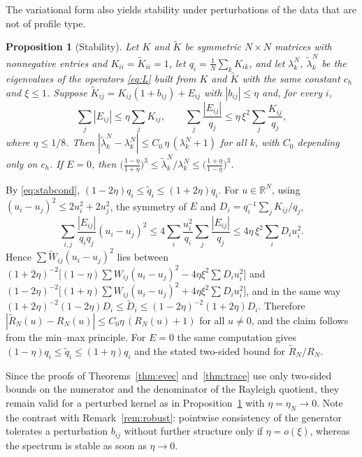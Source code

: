 \documentclass[11pt,a4paper]{article}
\makeatletter
\theoremstyle{stmt}
\newtheorem{proposition}[theorem]{Proposition}
\theoremstyle{defn}
\theoremstyle{rmk}
\renewenvironment{proof}[1][\proofname]{\par\pushQED{\qed}\normalfont\topsep6\p@\@plus6\p@\relax
  \trivlist\item[\hskip\labelsep{\sffamily\itshape\small #1.}]\ignorespaces}{\popQED\endtrivlist\@endpefalse}
\numberwithin{equation}{section}
\newcommand{\R}{\mathbb{R}}
\makeatother
\begin{document}
The variational form also yields stability under perturbations of the data that are not of profile type.

\begin{proposition}[Stability]\label{prop:stab}
Let $K$ and $\tilde K$ be symmetric $N\times N$ matrices with nonnegative entries and $K_{ii}=\tilde K_{ii}=1$, let $q_i=\frac1N\sum_kK_{ik}$, and let $\lambda^N_k$, $\tilde\lambda^N_k$ be the eigenvalues of the operators \eqref{eq:L} built from $K$ and $\tilde K$ with the same constant $c_h$ and $\xi\le1$. Suppose $\tilde K_{ij}=K_{ij}(1+b_{ij})+E_{ij}$ with $|b_{ij}|\le\eta$ and, for every $i$,
\begin{equation}\label{eq:stabcond}
\sum_j|E_{ij}|\le\eta\sum_jK_{ij},\qquad \sum_j\frac{|E_{ij}|}{q_j}\le\eta\,\xi^2\sum_j\frac{K_{ij}}{q_j},
\end{equation}
where $\eta\le1/8$. Then $|\tilde\lambda^N_k-\lambda^N_k|\le C_0\,\eta\,(\lambda^N_k+1)$ for all $k$, with $C_0$ depending only on $c_h$. If $E=0$, then $\big(\tfrac{1-\eta}{1+\eta}\big)^3\le\tilde\lambda_k^N/\lambda_k^N\le\big(\tfrac{1+\eta}{1-\eta}\big)^3$.
\end{proposition}

\begin{proof}
By \eqref{eq:stabcond}, $(1-2\eta)q_i\le\tilde q_i\le(1+2\eta)q_i$. For $u\in\R^N$, using $(u_i-u_j)^2\le2u_i^2+2u_j^2$, the symmetry of $E$ and $D_i=q_i^{-1}\sum_jK_{ij}/q_j$,
\[
\sum_{i,j}\frac{|E_{ij}|}{q_iq_j}(u_i-u_j)^2\le4\sum_i\frac{u_i^2}{q_i}\sum_j\frac{|E_{ij}|}{q_j}\le4\eta\,\xi^2\sum_iD_iu_i^2 .
\]
Hence $\sum\tilde W_{ij}(u_i-u_j)^2$ lies between $(1+2\eta)^{-2}\big[(1-\eta)\sum W_{ij}(u_i-u_j)^2-4\eta\xi^2\sum D_iu_i^2\big]$ and $(1-2\eta)^{-2}\big[(1+\eta)\sum W_{ij}(u_i-u_j)^2+4\eta\xi^2\sum D_iu_i^2\big]$, and in the same way $(1+2\eta)^{-2}(1-2\eta)D_i\le\tilde D_i\le(1-2\eta)^{-2}(1+2\eta)D_i$. Therefore $|\tilde R_N(u)-R_N(u)|\le C_0\eta\,(R_N(u)+1)$ for all $u\ne0$, and the claim follows from the min--max principle. For $E=0$ the same computation gives $(1-\eta)q_i\le\tilde q_i\le(1+\eta)q_i$ and the stated two-sided bound for $\tilde R_N/R_N$.
\end{proof}

Since the proofs of Theorems~\ref{thm:evec} and~\ref{thm:trace} use only two-sided bounds on the numerator and the denominator of the Rayleigh quotient, they remain valid for a perturbed kernel as in Proposition~\ref{prop:stab} with $\eta=\eta_N\to0$. Note the contrast with Remark~\ref{rem:robust}: pointwise consistency of the generator tolerates a perturbation $b_{ij}$ without further structure only if $\eta=o(\xi)$, whereas the spectrum is stable as soon as $\eta\to0$.
\end{document}
